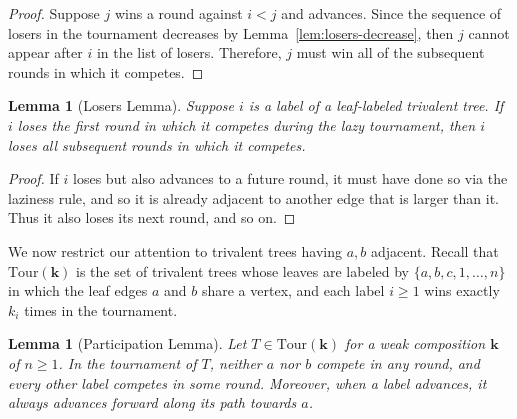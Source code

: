 \documentclass[11pt]{amsart}
\newcommand{\Tour}{\mathrm{Tour}}
\newtheorem{lemma}[thm]{Lemma}
\numberwithin{thm}{section}
\numberwithin{equation}{section}
\numberwithin{figure}{section}
\theoremstyle{definition}
\begin{document}
\begin{proof}
  Suppose $j$ wins a round against $i<j$ and advances. Since the sequence of losers in the tournament decreases by Lemma~\ref{lem:losers-decrease}, then $j$ cannot appear after $i$ in the list of losers. Therefore, $j$ must win all of the subsequent rounds in which it competes.
\end{proof}

\begin{lemma}[Losers Lemma]\label{lem:losers-lose}
Suppose $i$ is a label of a leaf-labeled trivalent tree. If $i$ loses the first round in which it competes during the lazy tournament, then $i$ loses all subsequent rounds in which it competes.
\end{lemma}

\begin{proof}
  If $i$ loses but also advances to a future round, it must have done so via the laziness rule, and so it is already adjacent to another edge that is larger than it.  Thus it also loses its next round, and so on.
\end{proof}



We now restrict our attention to trivalent trees having $a,b$ adjacent.  Recall that $\Tour(\mathbf{k})$ is the set of trivalent trees whose leaves are labeled by $\{a,b,c,1,\dots, n\}$ in which the leaf edges $a$ and $b$ share a vertex, and each label $i\geq 1$ wins exactly $k_i$ times in the tournament.


\begin{lemma}[Participation Lemma]\label{lem:numbers-used}
 Let $T\in \Tour(\mathbf{k})$ for a weak composition $\mathbf{k}$ of $n\geq 1$.  In the tournament of $T$, neither $a$ nor $b$ compete in any round, and every other label competes in some round.  Moreover, when a label advances, it always advances forward along its path towards $a$.
 \end{lemma}
\end{document}
